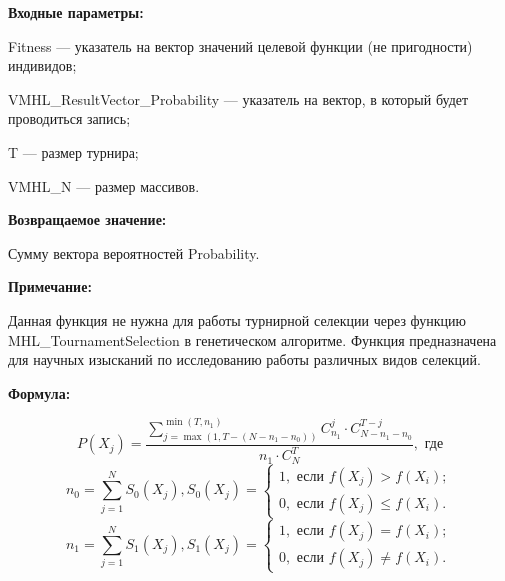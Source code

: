 \textbf{Входные параметры:}  
 
 Fitness --- указатель на вектор значений целевой функции (не пригодности) индивидов;
 
 VMHL\_ResultVector\_Probability --- указатель на вектор, в который будет проводиться запись;
 
 T --- размер турнира;
 
 VMHL\_N ---  размер массивов.

\textbf{Возвращаемое значение:}

 Сумму вектора вероятностей Probability.
 
  \textbf{Примечание:}
  
   Данная функция не нужна для работы турнирной селекции через функцию MHL\_TournamentSelection в генетическом алгоритме. Функция предназначена для научных изысканий по исследованию работы  различных видов селекций.
 
 \textbf{Формула:}
 
\begin{equation*}
P\left( X_j\right) = \dfrac{\sum_{j=\max \left(1, T-\left( N-n_1-n_0\right)  \right) }^{\min \left( T, n_1\right) }C_{n_1}^j\cdot C_{ N-n_1-n_0}^{T-j}}{n_1\cdot C_N^T}, \text{ где}
\end{equation*}
\begin{equation*}
n_0=\sum_{j=1}^{N} S_0\left( X_j\right), S_0\left( X_j\right)=\left\lbrace \begin{aligned} 1, \text{ если } f\left( X_j\right)> f\left( X_i\right); \\ 0, \text{ если } f\left( X_j\right)\leq f\left( X_i\right). \end{aligned}\right.
\end{equation*}
\begin{equation*}
n_1=\sum_{j=1}^{N} S_1\left( X_j\right), S_1\left( X_j\right)=\left\lbrace \begin{aligned} 1, \text{ если } f\left( X_j\right)= f\left( X_i\right); \\ 0, \text{ если } f\left( X_j\right)\neq f\left( X_i\right). \end{aligned}\right.
\end{equation*}
